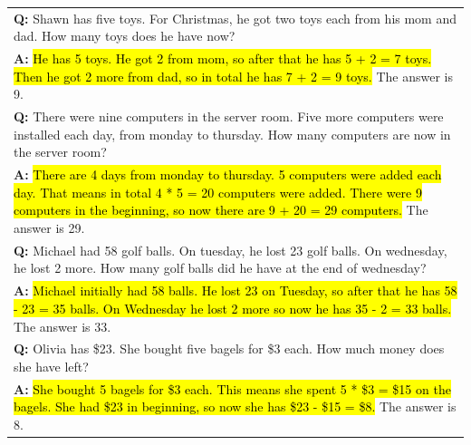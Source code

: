 \documentclass[]{article}
\theoremstyle{plain}
\theoremstyle{definition}
\theoremstyle{remark}
\begin{document}
\begin{table}[H]
\begin{tabular}{p{\linewidth}}
        \vspace{0mm}
        \textbf{Q:} Shawn has five toys. For Christmas, he got two toys each from his mom and dad. How many toys does he have now? \\
        \vspace{-1mm}
        \textbf{A:} \hl{He has 5 toys. He got 2 from mom, so after that he has 5 + 2 = 7 toys. Then he got 2 more from dad, so in total he has 7 + 2 = 9 toys.} The answer is 9. \\
        \vspace{0mm}
        \textbf{Q:} There were nine computers in the server room. Five more computers were installed each day, from monday to thursday. How many computers are now in the server room? \\
        \vspace{-1mm}
        \textbf{A:} \hl{There are 4 days from monday to thursday. 5 computers were added each day. That means in total 4 * 5 = 20 computers were added. There were 9 computers in the beginning, so now there are 9 + 20 = 29 computers.} The answer is 29. \\
        \vspace{0mm}
        \textbf{Q:} Michael had 58 golf balls. On tuesday, he lost 23 golf balls. On wednesday, he lost 2 more. How many golf balls did he have at the end of wednesday? \\
        \vspace{-1mm}
        \textbf{A:} \hl{Michael initially had 58 balls. He lost 23 on Tuesday, so after that he has 58 - 23 = 35 balls. On Wednesday he lost 2 more so now he has 35 - 2 = 33 balls.} The answer is 33. \\
        \vspace{0mm}
        \textbf{Q:} Olivia has \$23. She bought five bagels for \$3 each. How much money does she have left? \\
        \vspace{-1mm}
        \textbf{A:} \hl{She bought 5 bagels for \$3 each. This means she spent 5 * \$3 = \$15 on the bagels. She had \$23 in beginning, so now she has \$23 - \$15 = \$8.} The answer is 8. \\
        \bottomrule
    \end{tabular}
    \label{tab:appendix-mwp-prompts-alt-b}
\end{table}
\endgroup
\end{document}
